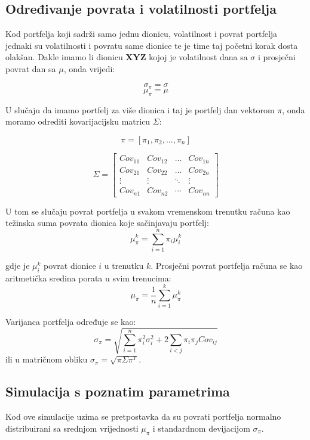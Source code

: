 \documentclass[times, utf8, seminar]{fer}
\begin{document}
\subsection{Određivanje povrata i volatilnosti portfelja}

Kod portfelja koji sadrži samo jednu dionicu, volatilnost i povrat portfelja jednaki su volatilnosti i povratu same dionice te je time taj početni korak dosta olakšan. Dakle imamo li dionicu \textbf{XYZ} kojoj je volatilnost dana sa $\sigma$ i prosječni povrat dan sa $\mu$, onda vrijedi:

\[ \sigma_{\pi} = \sigma \]
\[ \mu_{\pi} = \mu \]

U slučaju da imamo portfelj za više dionica i taj je portfelj dan vektorom \( \pi \), onda moramo odrediti kovarijacijsku matricu \( \Sigma \):

\[ \pi = [\pi_1, \pi_2,...,\pi_n] \]

\begin{equation*}
\Sigma =
\begin{bmatrix}
    Cov_{11} & Cov_{12} & \ldots & Cov_{1n} \\
    Cov_{21} & Cov_{22} & \ldots & Cov_{2n} \\
    \vdots & \vdots & \ddots & \vdots \\
    Cov_{n1} & Cov_{n2} & \cdots & Cov_{nn}
\end{bmatrix}
\end{equation*}

U tom se slučaju povrat portfelja u svakom vremenskom trenutku računa kao težinska suma povrata dionica koje sačinjavaju portfelj:
\[ \mu_{\pi}^k = \sum_{i=1}^{n}\pi_i\mu_i^k \]

\noindent gdje je $\mu_i^k$ povrat dionice $i$ u trenutku $k$. Prosječni povrat portfelja računa se kao aritmetička sredina porata u svim trenucima:
\[ \mu_{\pi} = \frac{1}{n}\sum_{i=1}^{k}\mu_{\pi}^{k} \]

\noindent Varijanca portfelja određuje se kao:
\[ \sigma_{\pi} = \sqrt{\sum_{i=1}^{n}\pi_i^2\sigma_i^2 + 2\sum_{i<j}\pi_i\pi_jCov_{ij}}\]
ili u matričnom obliku \( \sigma_{\pi} = \sqrt{\pi\Sigma\pi^T} \).

\subsection{Simulacija s poznatim parametrima}
Kod ove simulacije uzima se pretpostavka da su povrati portfelja normalno distribuirani sa srednjom vrijednosti $\mu_{\pi}$ i standardnom devijacijom $\sigma_{\pi}$.
\end{document}
